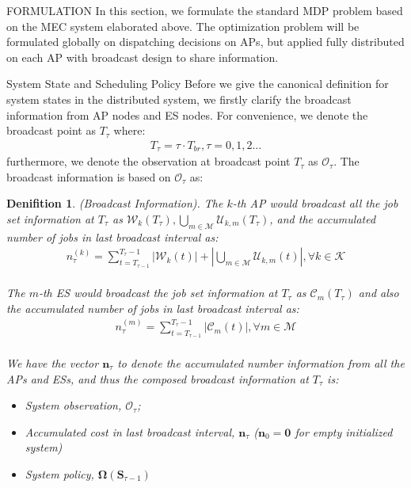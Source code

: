 \documentclass[10pt, conference, letterpaper]{IEEEtran}
\newtheorem{definition}{Denifition}
\renewcommand{\vec}{\mathbf}
\newcommand{\apSet}{\mathcal{K}}
\newcommand{\esSet}{\mathcal{M}}
\newcommand{\wSet}{\mathcal{W}}
\newcommand{\uSet}{\mathcal{U}}
\newcommand{\cSet}{\mathcal{C}}
\newcommand{\Stat}{\mathbf{S}}
\newcommand{\Obsv}{\mathcal{O}}
\begin{document}
    \begin{section}{FORMULATION}
        \label{sec:formulation}
        In this section, we formulate the standard MDP problem based on the MEC system elaborated above. The optimization problem will be formulated globally on dispatching decisions on APs, but applied fully distributed on each AP with broadcast design to share information.

        \begin{subsection}{System State and Scheduling Policy}
            Before we give the canonical definition for system states in the distributed system, we firstly clarify the broadcast information from AP nodes and ES nodes. For convenience, we denote the broadcast point as $T_\tau$ where:
            \begin{align}
                T_\tau = \tau \cdot T_{br}, \tau=0,1,2\dots
            \end{align}
            furthermore, we denote the observation at broadcast point $T_\tau$ as $\Obsv_\tau$. The broadcast information is based on $\Obsv_\tau$ as:
            \begin{definition}(Broadcast Information).
                The $k$-th AP would broadcast all the job set information at $T_\tau$ as $\wSet_{k}(T_\tau), \bigcup\limits_{m\in\esSet}\uSet_{k,m}(T_\tau)$, and the accumulated number of jobs in last broadcast interval as:
                \begin{align}
                    n^{(k)}_\tau = \sum_{t=T_{\tau-1}}^{T_\tau-1} |\wSet_{k}(t)| + |\bigcup\limits_{m\in\esSet}\uSet_{k,m}(t)|,\forall k \in \apSet
                \end{align}
                \\
                The $m$-th ES would broadcast the job set information at $T_\tau$ as $\cSet_{m}(T_\tau)$ and also the accumulated number of jobs in last broadcast interval as:
                \begin{align}
                    n^{(m)}_\tau = \sum_{t=T_{\tau-1}}^{T_\tau-1} |\cSet_{m}(t)|,\forall m \in \esSet
                \end{align}
                \\
                We have the vector $\vec{n}_\tau$ to denote the accumulated number information from all the APs and ESs, and thus the composed broadcast information at $T_\tau$ is:
                \begin{itemize}
                    \item System observation, $\Obsv_\tau$;
                    \item Accumulated cost in last broadcast interval, $\vec{n}_\tau$ ($\vec{n}_0=\mathbf{0}$ for empty initialized system)
                    \item System policy, $\mathbf{\Omega}(\Stat_{\tau-1})$
                \end{itemize}
            \end{definition}


\end{subsection}
\end{section}
\end{document}
